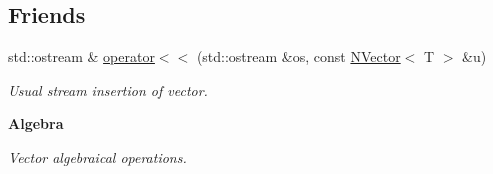 \subsection*{Friends}
\begin{DoxyCompactItemize}
\item 
std\+::ostream \& \mbox{\hyperlink{class_n_vector_a810496e91afe860d48d719dad343060d}{operator$<$$<$}} (std\+::ostream \&os, const \mbox{\hyperlink{class_n_vector}{N\+Vector}}$<$ T $>$ \&u)
\begin{DoxyCompactList}\small\item\em Usual stream insertion of vector. \end{DoxyCompactList}\end{DoxyCompactItemize}
\begin{Indent}\textbf{ Algebra}\par
{\em Vector algebraical operations.

}
\end{Indent}
